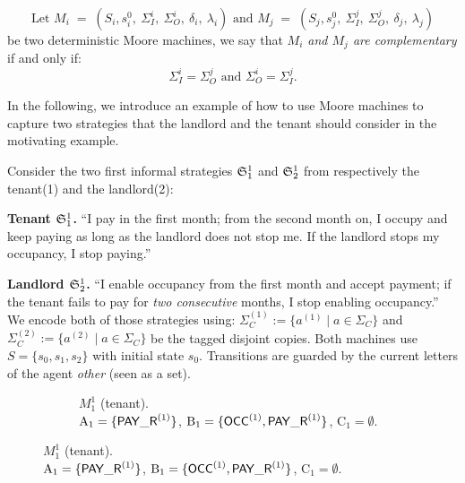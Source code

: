 \documentclass{article}
\begin{document}
  \begin{definition}
  \[\text{Let } 
  M_i \;=\; (S_i, s^0_i,\ \Sigma_I^i,\ \Sigma_O^i,\ \delta_i,\ \lambda_i) \text{ and } M_j \;=\; (S_j, s^0_j,\ \Sigma_I^j,\ \Sigma_O^j,\ \delta_j,\ \lambda_j) 
  \]
  be two deterministic Moore machines, we say that \emph{$M_i$ and $M_j$ are complementary} if and only if:
  \[ \Sigma_I^i = \Sigma_O^j \text{ and } \Sigma_O^i = \Sigma_I^j.\]
  \end{definition}
  In the following, we introduce an example of how to use Moore machines to capture two strategies that the landlord and the tenant should consider in the motivating example.
  \begin{example}
  \label{ex:twomoore}
  Consider the two first informal strategies $\mathfrak{S}_1^1$ and $\mathfrak{S}_2^1$ from respectively the tenant(1) and the landlord(2):
  
  \medskip
  \noindent\textbf{Tenant $\mathfrak{S}_1^1$.}
  “I pay in the first month; from the second month on, I occupy and keep paying as long as the landlord does not stop me. If the landlord stops my occupancy, I stop paying.”
  
  \noindent\textbf{Landlord $\mathfrak{S}_2^1$.}
  “I enable occupancy from the first month and accept payment; if the tenant fails to pay for \emph{two consecutive} months, I stop enabling occupancy.”
  We encode both of those strategies using: $\Sigma_C^{(1)}:=\{a^{(1)}\mid a\in\Sigma_C\}$ and
  $\Sigma_C^{(2)}:=\{a^{(2)}\mid a\in\Sigma_C\}$ be the tagged disjoint copies.
  Both machines use $S=\{s_0,s_1,s_2\}$ with initial state $s_0$.
  Transitions are guarded by the current letters of the agent \emph{other} (seen as a set).
  
  \begin{figure}[h]
  \centering
  \begin{subfigure}[t]{0.70\textwidth}
  \centering
  \caption{$M_1^1$ (tenant).\\ $\mathrm{A_1}=\{\mathsf{PAY\_R}^{(1)}\}$, $\mathrm{B_1}=\{\mathsf{OCC}^{(1)},\mathsf{PAY\_R}^{(1)}\}$, $\mathrm{C_1}=\emptyset$.}
  \label{fig:moore-tenant}
  \end{subfigure}
  

\end{figure}
\end{example}
\end{document}

